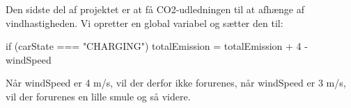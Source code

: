 \documentclass{ucph-handout}
\newcounter{handout}
\begin{document}
\begin{exercisebox}[adjusted title=CO2 udledning]
Den sidste del af projektet er at få CO2-udledningen til at afhænge af
vindhastigheden. Vi opretter en global variabel 
og sætter den til:
\begin{javascript}
if (carState === "CHARGING") {
    totalEmission = totalEmission + 4 - windSpeed
}
\end{javascript}

\noindent
Når windSpeed er 4 m/s, vil der derfor ikke forurenes, når windSpeed er
3 m/s, vil der forurenes en lille smule og så videre.
\end{exercisebox}









\end{document}
